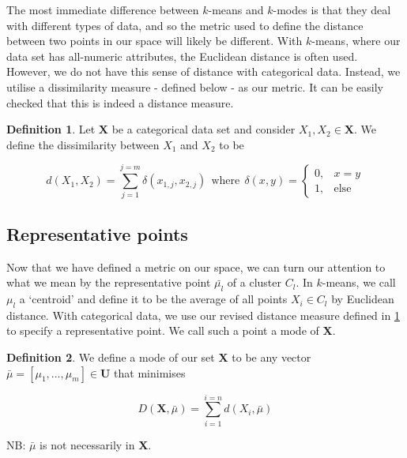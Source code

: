 \documentclass{article}
\theoremstyle{definition}
\newtheorem{definition}{Definition}[section]
\begin{document}
The most immediate difference between $k$-means and $k$-modes is that they deal with different types of data, and so the metric used to define the distance between two points in our space will likely be different. With $k$-means, where our data set has all-numeric attributes, the Euclidean distance is often used. However, we do not have this sense of distance with categorical data. Instead, we utilise a dissimilarity measure - defined below - as our metric. It can be easily checked that this is indeed a distance measure. \\


\begin{definition}\label{def:dissim}
Let $\textbf{X}$ be a categorical data set and consider $X_1, X_2\in \textbf{X}$. We define the dissimilarity between $X_1$ and $X_2$ to be

\[
d(X_1, X_2) = \sum_{j=1}^{j=m} \delta(x_{1,j}, x_{2,j}) \ \ \text{where} \ \ \delta(x, y) = \begin{cases}
																																	0, & x = y \\
                                                                                                    								1, & \text{else}
                                                                                               									 \end{cases}
\]
\end{definition}


\subsection{Representative points}\label{subsection:rep points}

Now that we have defined a metric on our space, we can turn our attention to what we mean by the representative point $\bar{\mu_l}$ of a cluster $C_l$. In $k$-means, we call $\mu_l$ a `centroid' and define it to be the average of all points $X_i \in C_l$ by Euclidean distance. With categorical data, we use our revised distance measure defined in \ref*{def:dissim} to specify a representative point. We call such a point a mode of \textbf{X}. \\

\begin{definition}\label{def:mode}
We define a mode of our set \textbf{X} to be any vector $\bar{\mu} = [\mu_1, \ldots, \mu_m] \in \textbf{U}$ that minimises

	\begin{equation}
		D(\textbf{X}, \bar{\mu}) = \sum_{i=1}^{i=n} d(X_i, \bar{\mu})
	\end{equation}

NB: $\bar{\mu}$ is not necessarily in \textbf{X}.
\end{definition}
\end{document}

